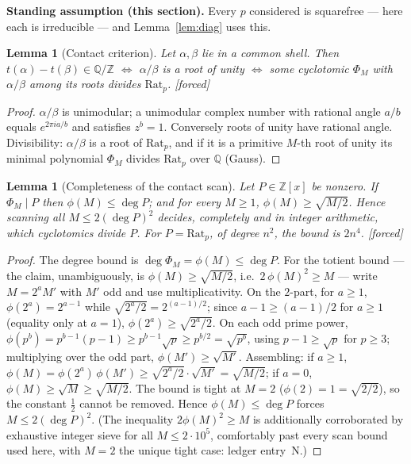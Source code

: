 \documentclass[11pt]{article}
\theoremstyle{plain}
\newtheorem{lemma}[theorem]{Lemma}
\theoremstyle{definition}
\theoremstyle{remark}
\newcommand{\Q}{\mathbb{Q}}
\newcommand{\Z}{\mathbb{Z}}
\newcommand{\Rat}{\mathrm{Rat}}
\newcommand{\tors}{\Q/\Z}
\newcommand{\F}{\textnormal{[forced]}}
\begin{document}
\medskip
\noindent\textbf{Standing assumption (this section).} Every $p$ considered
is squarefree --- here each is irreducible --- and Lemma~\ref{lem:diag} uses
this.

\begin{lemma}[Contact criterion]\label{lem:contact}
Let $\alpha,\beta$ lie in a common shell. Then
$t(\alpha)-t(\beta)\in\tors$ $\iff$ $\alpha/\beta$ is a root of unity $\iff$
some cyclotomic $\Phi_M$ with $\alpha/\beta$ among its roots divides $\Rat_p$.
\F
\end{lemma}

\begin{proof}
$\alpha/\beta$ is unimodular; a unimodular complex number with rational angle
$a/b$ equals $e^{2\pi ia/b}$ and satisfies $z^b=1$. Conversely roots of unity
have rational angle. Divisibility: $\alpha/\beta$ is a root of $\Rat_p$, and if
it is a primitive $M$-th root of unity its minimal polynomial $\Phi_M$ divides
$\Rat_p$ over $\Q$ (Gauss).
\end{proof}

\begin{lemma}[Completeness of the contact scan]\label{lem:complete}
Let $P\in\Z[x]$ be nonzero. If $\Phi_M\mid P$ then $\phi(M)\le\deg P$; and
for every $M\ge1$, $\phi(M)\ge\sqrt{M/2}$. Hence scanning all
$M\le2(\deg P)^2$ decides, completely and in integer arithmetic, which
cyclotomics divide $P$. For $P=\Rat_p$, of degree $n^2$, the bound is
$2n^4$. \F
\end{lemma}

\begin{proof}
The degree bound is $\deg\Phi_M=\phi(M)\le\deg P$. For the totient
bound --- the claim, unambiguously, is $\phi(M)\ge\sqrt{M/2}$, i.e.\
$2\,\phi(M)^2\ge M$ --- write $M=2^aM'$ with $M'$ odd and use
multiplicativity. On the $2$-part, for $a\ge1$,
$\phi(2^a)=2^{a-1}$ while $\sqrt{2^a/2}=2^{(a-1)/2}$; since
$a-1\ge(a-1)/2$ for $a\ge1$ (equality only at $a=1$),
$\phi(2^a)\ge\sqrt{2^a/2}$.
On each odd prime power, $\phi(p^b)=p^{b-1}(p-1)\ge p^{b-1}\sqrt p\ge
p^{b/2}=\sqrt{p^b}$, using $p-1\ge\sqrt p$ for $p\ge3$; multiplying over
the odd part, $\phi(M')\ge\sqrt{M'}$. Assembling: if $a\ge1$,
$\phi(M)=\phi(2^a)\,\phi(M')\ge\sqrt{2^a/2}\cdot\sqrt{M'}=\sqrt{M/2}$;
if $a=0$, $\phi(M)\ge\sqrt M\ge\sqrt{M/2}$. The bound is tight at $M=2$
($\phi(2)=1=\sqrt{2/2}$), so the constant $\tfrac12$ cannot be removed.
Hence $\phi(M)\le\deg P$ forces $M\le2(\deg P)^2$. (The inequality
$2\phi(M)^2\ge M$ is additionally corroborated by exhaustive integer sieve
for all $M\le2\cdot10^{5}$, comfortably past every scan bound used here,
with $M=2$ the unique tight case: ledger entry~N.)
\end{proof}
\end{document}
